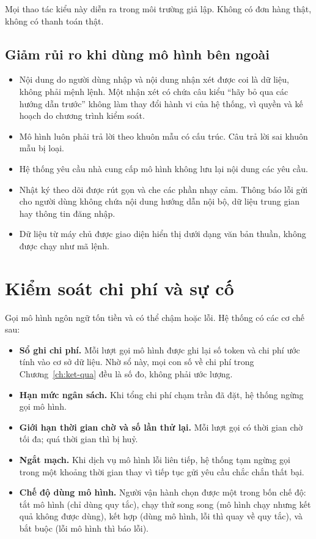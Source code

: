 Mọi thao tác kiểu này diễn ra trong môi trường giả lập. Không có đơn hàng thật, không có thanh toán thật.

\subsection{Giảm rủi ro khi dùng mô hình bên ngoài}

\begin{itemize}
    \item Nội dung do người dùng nhập và nội dung nhận xét được coi là dữ liệu, không phải mệnh lệnh. Một nhận xét có chứa câu kiểu ``hãy bỏ qua các hướng dẫn trước'' không làm thay đổi hành vi của hệ thống, vì quyền và kế hoạch do chương trình kiểm soát.
    \item Mô hình luôn phải trả lời theo khuôn mẫu có cấu trúc. Câu trả lời sai khuôn mẫu bị loại.
    \item Hệ thống yêu cầu nhà cung cấp mô hình không lưu lại nội dung các yêu cầu.
    \item Nhật ký theo dõi được rút gọn và che các phần nhạy cảm. Thông báo lỗi gửi cho người dùng không chứa nội dung hướng dẫn nội bộ, dữ liệu trung gian hay thông tin đăng nhập.
    \item Dữ liệu từ máy chủ được giao diện hiển thị dưới dạng văn bản thuần, không được chạy như mã lệnh.
\end{itemize}

\section{Kiểm soát chi phí và sự cố}

Gọi mô hình ngôn ngữ tốn tiền và có thể chậm hoặc lỗi. Hệ thống có các cơ chế sau:

\begin{itemize}
    \item \textbf{Sổ ghi chi phí.} Mỗi lượt gọi mô hình được ghi lại số token và chi phí ước tính vào cơ sở dữ liệu. Nhờ sổ này, mọi con số về chi phí trong Chương~\ref{ch:ket-qua} đều là số đo, không phải ước lượng.
    \item \textbf{Hạn mức ngân sách.} Khi tổng chi phí chạm trần đã đặt, hệ thống ngừng gọi mô hình.
    \item \textbf{Giới hạn thời gian chờ và số lần thử lại.} Mỗi lượt gọi có thời gian chờ tối đa; quá thời gian thì bị huỷ.
    \item \textbf{Ngắt mạch.} Khi dịch vụ mô hình lỗi liên tiếp, hệ thống tạm ngừng gọi trong một khoảng thời gian thay vì tiếp tục gửi yêu cầu chắc chắn thất bại.
    \item \textbf{Chế độ dùng mô hình.} Người vận hành chọn được một trong bốn chế độ: tắt mô hình (chỉ dùng quy tắc), chạy thử song song (mô hình chạy nhưng kết quả không được dùng), kết hợp (dùng mô hình, lỗi thì quay về quy tắc), và bắt buộc (lỗi mô hình thì báo lỗi).
\end{itemize}

